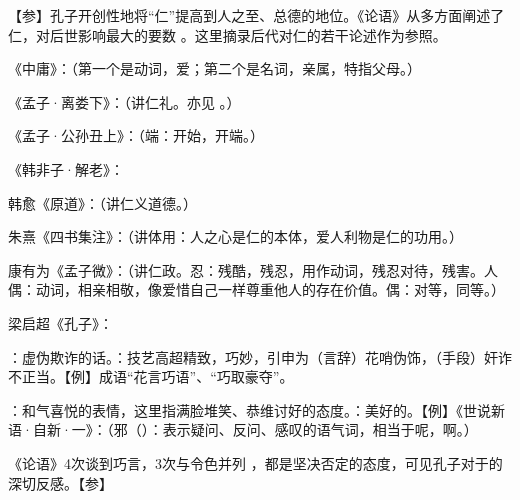 {【参】孔子开创性地将“仁”提高到人之至、总德的地位。《论语》从多方面阐述了仁，对后世影响最大的要数   。这里摘录后代对仁的若干论述作为参照。
\begin{lyitemize}
\item {}《中庸》：（第一个是动词，爱；第二个是名词，亲属，特指父母。）
\item 《孟子·离娄下》：（讲仁礼。亦见 。）
\item {}《孟子·公孙丑上》：（端：开始，开端。）
\item 《韩非子·解老》：
\item 韩愈《原道》：（讲仁义道德。）
\item 朱熹《四书集注》：（讲体用：人之心是仁的本体，爱人利物是仁的功用。）%
\item 康有为《孟子微》：（讲仁政。忍：残酷，残忍，用作动词，残忍对待，残害。人偶：动词，相亲相敬，像爱惜自己一样尊重他人的存在价值。偶：对等，同等。）
\item 梁启超《孔子》：
\end{lyitemize}
}
{}


{
\item {}：虚伪欺诈的话。：技艺高超精致，巧妙，引申为（言辞）花哨伪饰，（手段）奸诈不正当。【例】成语“花言巧语”、“巧取豪夺”。
\item {}：和气喜悦的表情，这里指满脸堆笑、恭维讨好的态度。：美好的。【例】《世说新语·自新·一》：（邪（）：表示疑问、反问、感叹的语气词，相当于呢，啊。） %

《论语》4次谈到巧言，3次与令色并列   ，都是坚决否定的态度，可见孔子对于的深切反感。【参】 
}
{}


